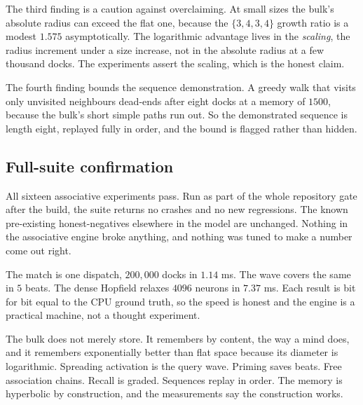 The third finding is a caution against overclaiming. At small sizes the bulk's absolute radius can exceed the flat one, because the $\{3,4,3,4\}$ growth ratio is a modest $1.575$ asymptotically. The logarithmic advantage lives in the \emph{scaling}, the radius increment under a size increase, not in the absolute radius at a few thousand docks. The experiments assert the scaling, which is the honest claim.

The fourth finding bounds the sequence demonstration. A greedy walk that visits only unvisited neighbours dead-ends after eight docks at a memory of $1500$, because the bulk's short simple paths run out. So the demonstrated sequence is length eight, replayed fully in order, and the bound is flagged rather than hidden.

\subsection{Full-suite confirmation}

All sixteen associative experiments pass. Run as part of the whole repository gate after the build, the suite returns no crashes and no new regressions. The known pre-existing honest-negatives elsewhere in the model are unchanged. Nothing in the associative engine broke anything, and nothing was tuned to make a number come out right.

\begin{principle}
The match is one dispatch, $200{,}000$ docks in $1.14$ ms. The wave covers the same in $5$ beats. The dense Hopfield relaxes $4096$ neurons in $7.37$ ms. Each result is bit for bit equal to the CPU ground truth, so the speed is honest and the engine is a practical machine, not a thought experiment.
\end{principle}

The bulk does not merely store. It remembers by content, the way a mind does, and it remembers exponentially better than flat space because its diameter is logarithmic. Spreading activation is the query wave. Priming saves beats. Free association chains. Recall is graded. Sequences replay in order. The memory is hyperbolic by construction, and the measurements say the construction works.
